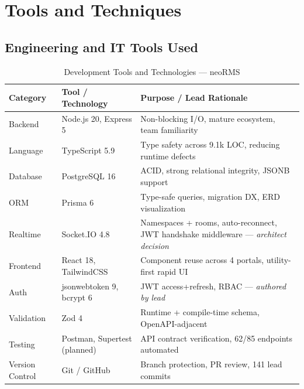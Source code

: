 \chapter{Tools and Techniques}
\label{ch:tools}

\section{Engineering and IT Tools Used}
\label{sec:tools_used}

\begin{table}[H]
\centering
\caption{Development Tools and Technologies --- neoRMS}
\label{tab:tools}
\small
\begin{tabularx}{\textwidth}{@{}p{}p{}p{}@{}}
\toprule
\textbf{Category} & \textbf{Tool / Technology} & \textbf{Purpose / Lead Rationale} \\
\midrule

Backend & Node.js 20, Express 5 & Non-blocking I/O, mature ecosystem, team familiarity \\

Language & TypeScript 5.9 & Type safety across 9.1k LOC, reducing runtime defects \\

Database & PostgreSQL 16 & ACID, strong relational integrity, JSONB support \\

ORM & Prisma 6 & Type-safe queries, migration DX, ERD visualization \\

Realtime & Socket.IO 4.8 & Namespaces + rooms, auto-reconnect, JWT handshake middleware --- \textit{architect decision} \\

Frontend & React 18, TailwindCSS & Component reuse across 4 portals, utility-first rapid UI \\

Auth & jsonwebtoken 9, bcrypt 6 & JWT access+refresh, RBAC --- \textit{authored by lead} \\

Validation & Zod 4 & Runtime + compile-time schema, OpenAPI-adjacent \\

Testing & Postman, Supertest (planned) & API contract verification, 62/85 endpoints automated \\

Version Control & Git / GitHub & Branch protection, PR review, 141 lead commits \\


\end{tabularx}
\end{table}
